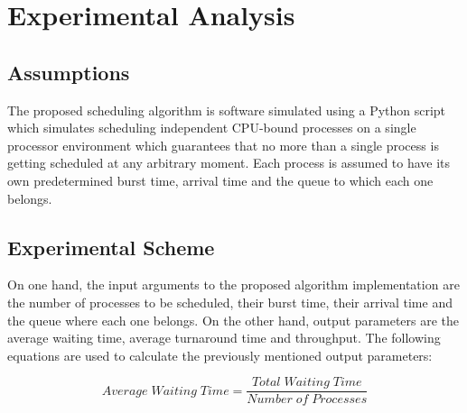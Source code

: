 \documentclass[conference]{IEEEtran}
\begin{document}

\section{Experimental Analysis}


\subsection{Assumptions}

The proposed scheduling algorithm is software simulated using a Python script which simulates scheduling independent CPU-bound processes on a single processor environment which guarantees that no more than a single process is getting scheduled at any arbitrary moment. Each process is assumed to have its own predetermined burst time, arrival time and the queue to which each one belongs.


\subsection{Experimental Scheme}

On one hand, the input arguments to the proposed algorithm implementation are the number of processes to be scheduled, their burst time, their arrival time and the queue where each one belongs. On the other hand, output parameters are the average waiting time, average turnaround time and throughput. The following equations are used to calculate the previously mentioned output parameters:

\begin{equation}
    Average\; Waiting\; Time =  \frac{Total \; Waiting \; Time}{Number \; of \; Processes} \label{eq2}
\end{equation}
\end{document}
